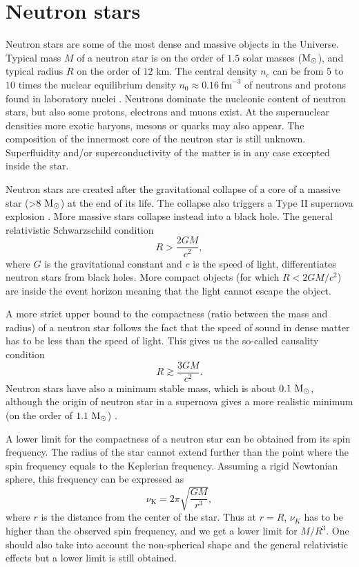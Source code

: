 \documentclass{wihuri}
\def\be{\begin{equation}}
\def\ee{\end{equation}}
\def\msun{{\rm M_{\odot}}}
\begin{document}
\section{Neutron stars}


Neutron stars are some of the most dense and massive objects in the
Universe. Typical mass $M$ of a neutron star is on the order of $1.5$ solar masses ($\msun$), %
and typical radius $R$ on the order of $12$ km. The central density $n_{c}$ can be from $5$ to $10$ times the nuclear equilibrium density $n_{0} \approx 0.16 ~\mathrm{fm}^{-3}$ of neutrons and protons found in laboratory nuclei \cite{lattimer}. Neutrons dominate the nucleonic content of neutron stars, but also some protons, electrons and muons exist. At the supernuclear densities more exotic baryons, mesons or quarks may also appear. The composition of the innermost core of the neutron star is still unknown. Superfluidity and/or superconductivity of the matter %
is in any case excepted inside the star. 

 
Neutron stars are created after the gravitational collapse of a core of a
massive star (>$8~\msun$) at the end of its life. The collapse also triggers a Type II supernova explosion \cite{lattimer}. More massive stars collapse instead into a black hole. The general relativistic Schwarzschild condition 
\be \label{eq:schw_cond}
 R > \frac{2GM}{c^{2}},
\ee 
where $G$ is the gravitational constant and $c$ is the speed of light, %
differentiates neutron stars from black holes. More compact objects (for which $R < 2GM/c^{2}$) are inside the event horizon meaning that the light cannot escape the object.


A more strict upper bound to the compactness (ratio between the mass and radius) of a neutron star follows
the fact \cite{rhoades} %
that the speed of sound in dense matter has to be less than the speed of light. This gives us the so-called causality condition
\be \label{eq:causality}
 R \gtrsim \frac{3GM}{c^{2}}.
\ee 
Neutron stars have also a minimum stable mass, which is about $0.1 ~\msun$, although the origin of neutron star in a supernova gives a more realistic minimum (on the order of $1.1 ~\msun$) \cite{lattimer2013}.

A lower limit for the compactness of a neutron star can be obtained from its spin frequency. The radius of the star cannot extend further than the point where the spin frequency equals to the Keplerian frequency. Assuming a rigid Newtonian sphere, this frequency can be expressed as
\be \label{eq:keplerian}
\nu_{\mathrm{K}} = 2 \pi \sqrt{\frac{GM}{r^{3}}},
\ee 
where $r$ is the distance from the center of the star. Thus at $r=R$, $\nu_{K}$ has to be higher than the observed spin frequency, and we get a lower limit for $M/R^{3}$. One should also take into account the non-spherical shape and the general relativistic effects but a lower limit is still obtained.
\end{document}
